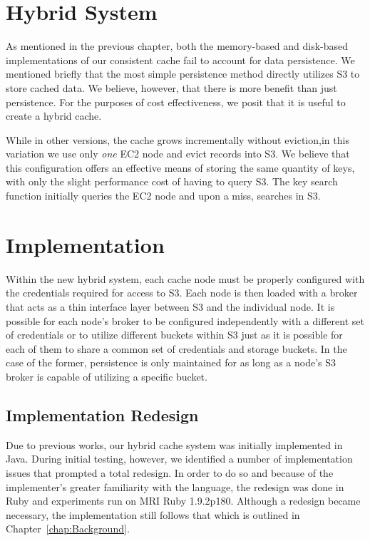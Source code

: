 \section{Hybrid System} %
\label{sec:hybrid_system}
As mentioned in the previous chapter, both the memory-based and disk-based
implementations of our consistent cache fail to account for data persistence.
We mentioned briefly that the most simple persistence method directly utilizes
S3 to store cached data. We believe, however, that there is more benefit than
just persistence. For the purposes of cost effectiveness, we posit that it is
useful to create a hybrid cache.

While in other versions, the cache grows incrementally without eviction,in this
variation we use only \emph{one} EC2 node and evict records into S3. We believe
that this configuration offers an effective means of storing the same quantity
of keys, with only the slight performance cost of having to query S3. The key
search function initially queries the EC2 node and upon a miss, searches in S3.


\section{Implementation} %
\label{sec:Implementation}
Within the new hybrid system, each cache node must be properly configured with
the credentials required for access to S3. Each node is then loaded with a
broker that acts as a thin interface layer between S3 and the individual node.
It is possible for each node's broker to be configured independently with a
different set of credentials or to utilize different buckets within S3 just as
it is possible for each of them to share a common set of credentials and
storage buckets. In the case of the former, persistence is only maintained for
as long as a node's S3 broker is capable of utilizing a specific bucket.

\subsection{Implementation Redesign} %
\label{sec:hybrid_redesign}
Due to previous works\cite{chiu_ccgrid11,chiu_ijngc11}, our hybrid cache system
was initially implemented in Java. During initial testing, however, we
identified a number of implementation issues that prompted a total redesign. In
order to do so and because of the implementer's greater familiarity with the
language, the redesign was done in Ruby and experiments run on MRI Ruby
1.9.2p180. Although a redesign became necessary, the implementation still
follows that which is outlined in Chapter~\ref{chap:Background}.

